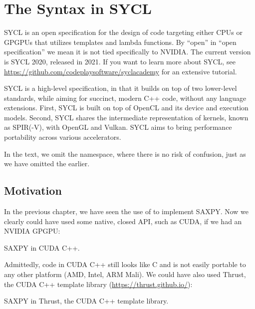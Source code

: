 \chapter{The Syntax in SYCL}

SYCL is an open specification for the design of code targeting either CPUs or GPGPUs 
that utilizes templates and lambda functions.
By ``open'' in ``open specification'' we mean it is not tied specifically to NVIDIA. 
The current version is SYCL 2020, released in 2021. 
If you want to learn more about SYCL, see 
\url{https://github.com/codeplaysoftware/syclacademy} for an extensive tutorial.

SYCL is a high-level specification, in that it builds on top of two lower-level standards, while aiming for succinct, modern C++ code, without any language extensions. First, SYCL is built on top of OpenCL and its device and execution models. Second, SYCL shares the intermediate representation of kernels, known as SPIR(-V), with OpenGL and Vulkan. 
SYCL aims to bring performance portability across various accelerators. 

In the text, we omit the  namespace, where there is no risk of confusion, just as we have omitted the  earlier.

\section{Motivation}

In the previous chapter, we have seen the use of  to implement SAXPY. Now we clearly could have used some native, closed API, such as CUDA, if we had an NVIDIA GPGPU:

\raggedbottom
\begin{codebox}[]{}
\footnotesize SAXPY in CUDA C++.
\tcblower
{}
\end{codebox}

Admittedly, code in CUDA C++ still looks like C and is not easily portable to any other platform (AMD, Intel, ARM Mali). We could have also used Thrust, the CUDA C++ template library (\url{https://thrust.github.io/}): 

\raggedbottom
\begin{codebox}[]{}
\footnotesize SAXPY in Thrust, the CUDA C++ template library.
\tcblower
{}
\end{codebox}

